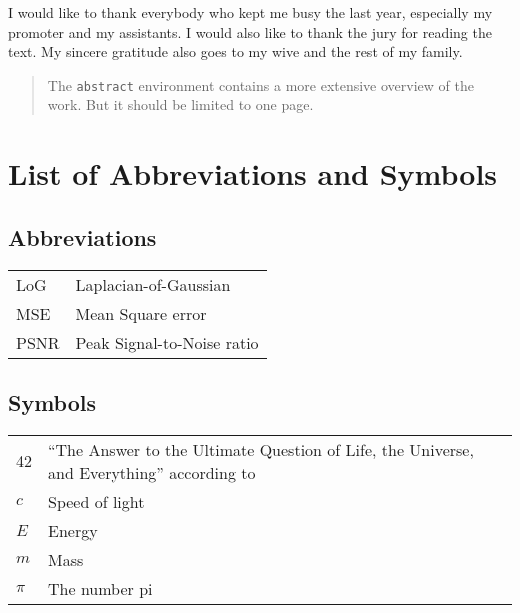 \documentclass[master=eelt,masteroption=ec]{kulemt}
\begin{document}
\begin{preface}
    I would like to thank everybody who kept me busy the last year,
    especially my promoter and my assistants. I would also like to thank the
    jury for reading the text. My sincere gratitude also goes to my wive and
    the rest of my family. \cite{aires-2020-information}
\end{preface}

\tableofcontents*

\begin{abstract}
    The \texttt{abstract} environment contains a more extensive overview of
    the work. But it should be limited to one page.
    \lipsum[1]
\end{abstract}

\listoffiguresandtables
\chapter{List of Abbreviations and Symbols}
\section*{Abbreviations}
\begin{flushleft}
    \renewcommand{\arraystretch}{1.1}
    \begin{tabularx}{\textwidth}{@{}p{12mm}X@{}}
        LoG  & Laplacian-of-Gaussian      \\
        MSE  & Mean Square error          \\
        PSNR & Peak Signal-to-Noise ratio \\
    \end{tabularx}
\end{flushleft}
\section*{Symbols}
\begin{flushleft}
    \renewcommand{\arraystretch}{1.1}
    \begin{tabularx}{\textwidth}{@{}p{12mm}X@{}}
        42    & ``The Answer to the Ultimate Question of Life, the Universe,
        and Everything'' according to \cite{h2g2}                            \\
        $c$   & Speed of light                                               \\
        $E$   & Energy                                                       \\
        $m$   & Mass                                                         \\
        $\pi$ & The number pi                                                \\
    \end{tabularx}
\end{flushleft}
\end{document}
